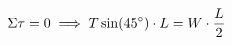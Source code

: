\documentclass[preview]{standalone}
\begin{document}
\begin{align*}
\special{dvisvgm:raw <g id='unique000'>}\Sigma \tau = 0 \implies T \sin(45^{\circ}) \cdot L = W \cdot \frac{L}{2}\special{dvisvgm:raw </g>}
\end{align*}
\end{document}
